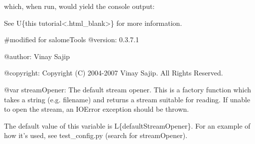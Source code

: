 \documentclass[a4paper,10pt,english]{sphinxmanual}
\begin{document}
which, when run, would yield the console output:

%
\begin{sphinxVerbatim}[commandchars=\\\{\}]
 
 
 
\end{sphinxVerbatim}

See U\{this tutorial\textless{}.html\textbar{}\_blank\textgreater{}\} for more
information.

\#modified for salomeTools
@version: 0.3.7.1

@author: Vinay Sajip

@copyright: Copyright (C) 2004-2007 Vinay Sajip. All Rights Reserved.

@var streamOpener: The default stream opener. This is a factory function which
takes a string (e.g. filename) and returns a stream suitable for reading. If
unable to open the stream, an IOError exception should be thrown.

The default value of this variable is L\{defaultStreamOpener\}. For an example
of how it’s used, see test\_config.py (search for streamOpener).
\end{document}
